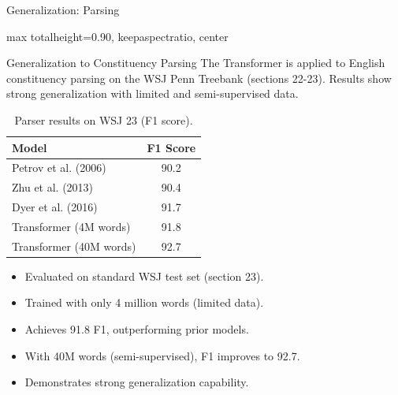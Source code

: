 \documentclass[
	11pt,
	aspectratio=169,
]{beamer}
\begin{document}
\begin{frame}{Generalization: Parsing}
\begin{adjustbox}{max totalheight=0.90\textheight, keepaspectratio, center}
\begin{minipage}{\linewidth}
\centering
\vspace{-0.5em}
\begin{block}{Generalization to Constituency Parsing}
The Transformer is applied to English constituency parsing on the WSJ Penn Treebank (sections 22-23). Results show strong generalization with limited and semi-supervised data.
\end{block}

\vspace{-0.5em}
\begin{table}
\centering
\caption{Parser results on WSJ 23 (F1 score).}
\begin{tabular}{l c}
\toprule
Model & F1 Score \\
\midrule
Petrov et al. (2006) & 90.2 \\
Zhu et al. (2013) & 90.4 \\
Dyer et al. (2016) & 91.7 \\
\alert{Transformer (4M words)} & \alert{91.8} \\
\alert{Transformer (40M words)} & \alert{92.7} \\
\bottomrule
\end{tabular}
\end{table}

\vspace{-0.5em}
\begin{itemize}
\setlength{\itemsep}{0pt}
\small
    \item Evaluated on standard WSJ test set (section 23).
    \item Trained with only 4 million words (limited data).
    \item Achieves 91.8 F1, outperforming prior models.
    \item With 40M words (semi-supervised), F1 improves to 92.7.
    \item Demonstrates strong generalization capability.
\end{itemize}
\end{minipage}
\end{adjustbox}
\end{frame}
\end{document}
